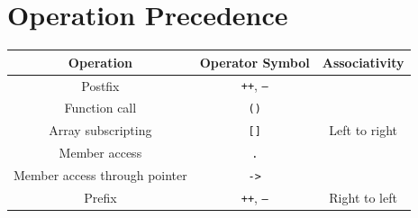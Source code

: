 \documentclass[a4paper]{report}
\begin{document}
\section{Operation Precedence}
\begin{table}[H]
    \centering
    \begin{tabular}{c c c}
        \toprule
        \textbf{Operation}            & \textbf{Operator Symbol}                                                                                                                                                                                                  & \textbf{Associativity}         \\
        \midrule
        Postfix                       & \texttt{++}, \texttt{--}                                                                                                                                                                                    & \multirow{5}{*}{Left to right} \\
        Function call                 & \texttt{()}                                                                                                                                                                                                        &                                \\
        Array subscripting            & \texttt{[]}                                                                                                                                                                                                        &                                \\
        Member access                 & \texttt{.}                                                                                                                                                                                                         &                                \\
        Member access through pointer & \texttt{->}                                                                                                                                                                                                        &                                \\
        \midrule
        Prefix                        & \texttt{++}, \texttt{--}                                                                                                                                                                                    & \multirow{7}{*}{Right to left} \\

\end{tabular}
\end{table}
\end{document}

